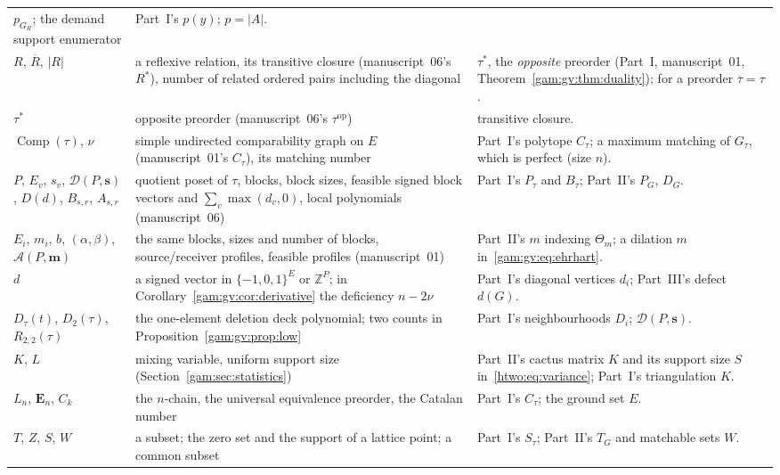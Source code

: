 \documentclass[11pt]{article}
\numberwithin{equation}{section}
\theoremstyle{definition}
\newcommand{\Z}{\mathbb Z}
\newcommand{\Comp}{\operatorname{Comp}}
\begin{document}
\begin{table}[p]
\begin{tabularx}{\textwidth}{@{}>{\raggedright}p{}>{\raggedright}p{}Y@{}}
 $p_{G_R}$; the demand support enumerator & Part~I's $p(y)$; $p=|A|$.\\
$R$, $\overline R$, $|R|$ & a reflexive relation, its transitive closure
 (manuscript~06's $R^*$), number of related ordered pairs including the
 diagonal & $\tau^*$, the \emph{opposite} preorder (Part~I, manuscript~01,
 Theorem~\ref{gam:gv:thm:duality}); for a preorder $\overline\tau=\tau$.\\
$\tau^*$ & opposite preorder (manuscript~06's $\tau^{\mathrm{op}}$) &
 transitive closure.\\
$\Comp(\tau)$, $\nu$ & simple undirected comparability graph on $E$
 (manuscript~01's $C_\tau$), its matching number & Part~I's polytope $C_\tau$;
 a maximum matching of $G_\tau$, which is perfect (size $n$).\\
$P$, $E_v$, $s_v$, $\mathcal D(P,\mathbf s)$, $D(d)$, $B_{s,r}$, $A_{s,r}$ &
 quotient poset of $\tau$, blocks, block sizes, feasible signed block vectors
 and $\sum_v\max(d_v,0)$, local polynomials (manuscript~06) & Part~I's
 $P_\tau$ and $B_\tau$; Part~II's $P_G$, $D_G$.\\
$E_i$, $m_i$, $b$, $(\alpha,\beta)$, $\mathcal A(P,\mathbf m)$ & the same
 blocks, sizes and number of blocks, source/receiver profiles, feasible
 profiles (manuscript~01) & Part~II's $m$ indexing $\Theta_m$; a dilation $m$
 in~\eqref{gam:gv:eq:ehrhart}.\\
$d$ & a signed vector in $\{-1,0,1\}^E$ or $\Z^P$; in
 Corollary~\ref{gam:gv:cor:derivative} the deficiency $n-2\nu$ & Part~I's
 diagonal vertices $d_i$; Part~III's defect $d(G)$.\\
$D_\tau(t)$, $D_2(\tau)$, $R_{2,2}(\tau)$ & the one-element deletion deck
 polynomial; two counts in Proposition~\ref{gam:gv:prop:low} & Part~I's
 neighbourhoods $D_i$; $\mathcal D(P,\mathbf s)$.\\
$K$, $L$ & mixing variable, uniform support size
 (Section~\ref{gam:sec:statistics}) & Part~II's cactus matrix $K$ and its
 support size $S$ in~\eqref{htwo:eq:variance}; Part~I's triangulation $K$.\\
$L_n$, $\mathbf E_n$, $C_k$ & the $n$-chain, the universal equivalence
 preorder, the Catalan number & Part~I's $C_\tau$; the ground set $E$.\\
$T$, $Z$, $S$, $W$ & a subset; the zero set and the support of a lattice
 point; a common subset & Part~I's $S_\tau$; Part~II's $T_G$ and matchable
 sets $W$.\\
\bottomrule
\end{tabularx}
\end{table}
\end{document}
